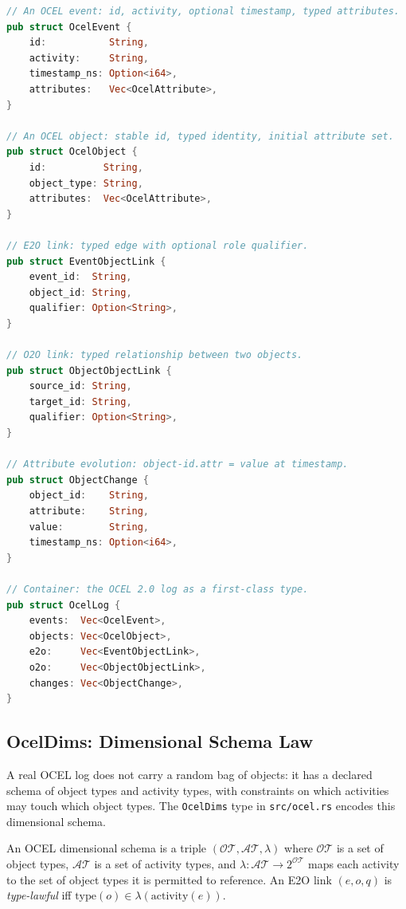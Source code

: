 \begin{lstlisting}[language=Rust,
  caption={The five OCEL 2.0 formal objects as Rust types. Structure-only --- no engine
    logic, no discovery.},
  label={lst:ocel-types}]
// An OCEL event: id, activity, optional timestamp, typed attributes.
pub struct OcelEvent {
    id:           String,
    activity:     String,
    timestamp_ns: Option<i64>,
    attributes:   Vec<OcelAttribute>,
}

// An OCEL object: stable id, typed identity, initial attribute set.
pub struct OcelObject {
    id:          String,
    object_type: String,
    attributes:  Vec<OcelAttribute>,
}

// E2O link: typed edge with optional role qualifier.
pub struct EventObjectLink {
    event_id:  String,
    object_id: String,
    qualifier: Option<String>,
}

// O2O link: typed relationship between two objects.
pub struct ObjectObjectLink {
    source_id: String,
    target_id: String,
    qualifier: Option<String>,
}

// Attribute evolution: object-id.attr = value at timestamp.
pub struct ObjectChange {
    object_id:    String,
    attribute:    String,
    value:        String,
    timestamp_ns: Option<i64>,
}

// Container: the OCEL 2.0 log as a first-class type.
pub struct OcelLog {
    events:  Vec<OcelEvent>,
    objects: Vec<OcelObject>,
    e2o:     Vec<EventObjectLink>,
    o2o:     Vec<ObjectObjectLink>,
    changes: Vec<ObjectChange>,
}
\end{lstlisting}

\subsection{OcelDims: Dimensional Schema Law}

A real OCEL log does not carry a random bag of objects: it has a declared schema of object
types and activity types, with constraints on which activities may touch which object types.
The \texttt{OcelDims} type in \texttt{src/ocel.rs} encodes this dimensional schema.

\begin{definition}
\label{def:ocel-dims}
An OCEL dimensional schema is a triple $(\mathcal{OT}, \mathcal{AT}, \lambda)$ where
$\mathcal{OT}$ is a set of object types, $\mathcal{AT}$ is a set of activity types, and
$\lambda: \mathcal{AT} \to 2^{\mathcal{OT}}$ maps each activity to the set of object types
it is permitted to reference. An E2O link $(e, o, q)$ is \emph{type-lawful} iff
$\text{type}(o) \in \lambda(\text{activity}(e))$.
\end{definition}

